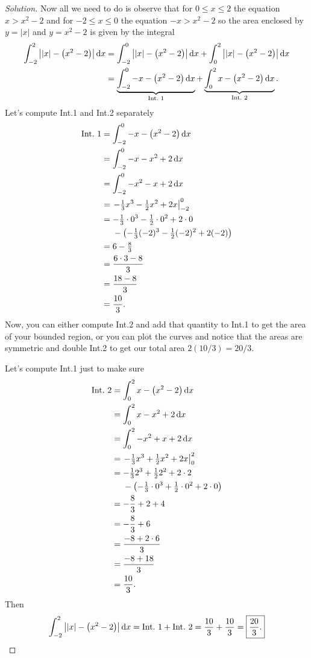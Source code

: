 \documentclass{article}
\theoremstyle{plain}
\theoremstyle{definition}
\theoremstyle{remark}
\DeclareMathOperator{\diff}{d\!}
\begin{document}
\begin{proof}[Solution]
Now all we need to do is observe that for $0\leq x\leq 2$ the equation
$x>x^2-2$ and for $-2\leq x\leq 0$ the equation $-x>x^2-2$ so the area
enclosed by $y=|x|$ and $y=x^2-2$ is given by the integral
\begingroup
\allowdisplaybreaks
\begin{align*}
\int_{-2}^2\left||x|-\left(x^2-2\right)\right|\diff x
&=\int_{-2}^0\left||x|-\left(x^2-2\right)\right|\diff x
+\int_0^2\left||x|-\left(x^2-2\right)\right|\diff x\\
&=\underbrace{\int_{-2}^0-x-\left(x^2-2\right)\diff x}_{\text{Int.\@ 1}}
+\underbrace{\int_0^2x-\left(x^2-2\right)\diff x}_{\text{Int.\@ 2}}.
\end{align*}
\endgroup
Let's compute Int.\@ 1 and Int.\@ 2 separately
\begingroup
\allowdisplaybreaks
\begin{align*}
\text{Int.\@ 1}
&=\int_{-2}^0 -x-\left(x^2-2\right)\diff x\\
&=\int_{-2}^0 -x-x^2+2\diff x\\
&=\int_{-2}^0 -x^2-x+2\diff x\\
&=\left.-\tfrac{1}{3}x^3-\tfrac{1}{2}x^2+2x\right|_{-2}^0\\
&=-\tfrac{1}{3}\cdot 0^3-\tfrac{1}{2}\cdot 0^2+2\cdot 0\\
&\phantom{{}={}}-\left(-\tfrac{1}{3}(-2)^3-\tfrac{1}{2}(-2)^2+2(-2)\right)\\
&=6-\tfrac{8}{3}\\
&=\frac{6\cdot 3-8}{3}\\
&=\frac{18-8}{3}\\
&=\frac{10}{3}.
\end{align*}
\endgroup
Now, you can either compute Int.\@ 2 and add that quantity to Int.\@ 1 to
get the area of your bounded region, or you can plot the curves and notice
that the areas are symmetric and double Int.\@ 2 to get our total area
$\boxed{2(10/3)=20/3}$.

Let's compute Int.\@ 1 just to make sure
\begingroup
\allowdisplaybreaks
\begin{align*}
\text{Int.\@ 2}
&=\int_0^2 x-\left(x^2-2\right)\diff x\\
&=\int_0^2x-x^2+2\diff x\\
&=\int_0^2-x^2+x+2\diff x\\
&=\left.-\tfrac{1}{3}x^3+\tfrac{1}{2}x^2+2x\right|_0^2\\
&=-\tfrac{1}{3}2^3+\tfrac{1}{2}2^2+2\cdot 2\\
&\phantom{{}={}}-\left(-\tfrac{1}{3}\cdot 0^3+\tfrac{1}{2}\cdot 0^2+2\cdot
  0\right)\\
&=-\frac{8}{3}+2+4\\
&=-\frac{8}{3}+6\\
&=\frac{-8+2\cdot 6}{3}\\
&=\frac{-8+18}{3}\\
&=\frac{10}{3}.
\end{align*}
\endgroup
Then
\[
\int_{-2}^2\left||x|-\left(x^2-2\right)\right|\diff x=\text{Int.\@
  1}+\text{Int.\@ 2}=\frac{10}{3}+\frac{10}{3}=\boxed{\frac{20}{3}.}\qedhere
\]
\end{proof}
\end{document}
